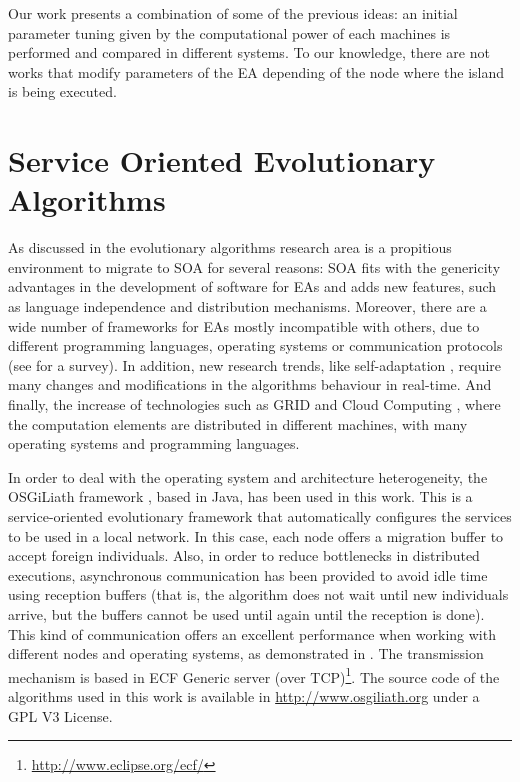  Our work presents a combination of some of the previous ideas:
 an initial parameter tuning given by the computational power of each
 machines is performed and compared in different systems. To our knowledge, there are not works that
 modify parameters of the EA depending of the
 node where the island is being executed. 



\section{Service Oriented Evolutionary Algorithms}
\label{sec:soaea}



As discussed in \cite{SOASOCO} the evolutionary algorithms research area is a propitious environment to migrate to SOA for several reasons: SOA fits with the genericity advantages in the development of software for EAs \cite{GENERICITY05} and adds new features, such as language independence and  distribution mechanisms. Moreover, there are a wide number of frameworks for EAs mostly incompatible with others, due to different programming languages, operating systems or communication protocols (see \cite{SURVEYMOFS} for a survey). In addition, new research trends, like self-adaptation \cite{SELFSTAR}, require many changes and modifications in the algorithms behaviour in real-time. And finally, the increase of technologies such as GRID and Cloud Computing \cite{CLOUD}, where the computation elements are distributed in different machines, with many operating systems and programming languages.

In order to deal with the operating system and architecture
heterogeneity, the OSGiLiath framework \cite{SOASOCO}, based in Java,
has been used in this work. This is a service-oriented evolutionary
framework that automatically configures the services to be used in a
local network. In this case, each node offers a migration buffer to
accept foreign individuals. Also, in order to reduce bottlenecks in
distributed executions, asynchronous communication has been provided
to avoid idle time using reception buffers (that is, the algorithm
does not wait until new individuals arrive, but the buffers cannot be
used until again until the reception is done). This kind of
communication offers an excellent performance when working with
different nodes and operating systems, as demonstrated in
\cite{HETEROGENEOUSHARD}. The transmission mechanism is based in ECF
Generic server (over
TCP)\footnote{\url{http://www.eclipse.org/ecf/}}. 
The source code of
the algorithms used in this work is available in
\url{http://www.osgiliath.org} under a GPL V3 License. 


